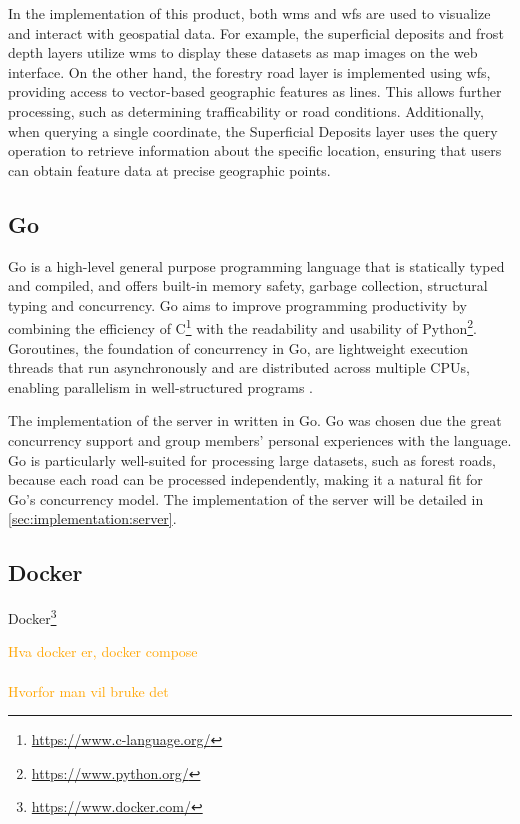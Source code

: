 In the implementation of this product, both \Gls{wms} and \Gls{wfs} are used to visualize and interact with geospatial data. For example, the superficial deposits and frost depth layers utilize \Gls{wms} to display these datasets as map images on the web interface. On the other hand, the forestry road layer is implemented using \Gls{wfs}, providing access to vector-based geographic features as lines. This allows further processing, such as determining \gls{trafficability} or road conditions. Additionally, when querying a single coordinate, the Superficial Deposits layer uses the query operation to retrieve information about the specific location, ensuring that users can obtain feature data at precise geographic points.

\subsection{Go}

Go is a high-level general purpose programming language that is statically typed and compiled, and offers built-in memory safety, garbage collection, structural typing and concurrency. Go aims to improve programming productivity by combining the efficiency of C\footnote{\url{https://www.c-language.org/}} with the readability and usability of Python\footnote{\url{https://www.python.org/}}. Goroutines, the foundation of concurrency in Go, are lightweight execution threads that run asynchronously and are distributed across multiple CPUs, enabling parallelism in well-structured programs \cite{goproglanguage}.

The implementation of the server in written in Go. Go was chosen due the great concurrency support and group members' personal experiences with the language. Go is particularly well-suited for processing large datasets, such as forest roads, because each road can be processed independently, making it a natural fit for Go’s concurrency model. The implementation of the server will be detailed in \autoref{sec:implementation:server}.

\subsection{Docker}

Docker\footnote{\url{https://www.docker.com/}} 

\cite{containerizationwikipedia}
\cite{dockerwikipedia}

\textcolor{orange}{
Hva docker er, docker compose \\ \\
Hvorfor man vil bruke det
}


